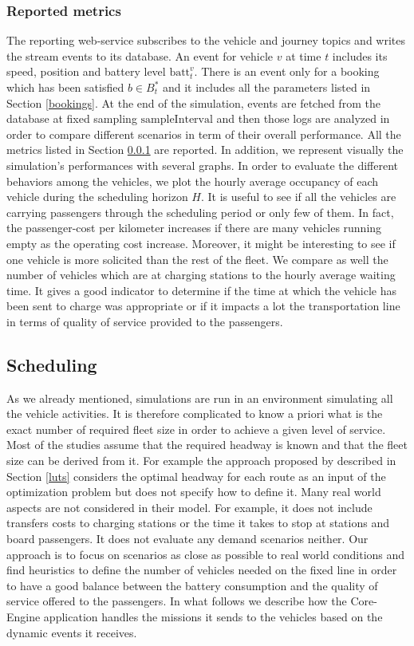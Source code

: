 \documentclass[12pt,a4paper]{article}
\begin{document}
\subsubsection{Reported metrics}\label{metrics}
The reporting web-service subscribes to the vehicle and journey topics and writes the stream events to its database. An event for vehicle $v$ at time $t$ includes its speed, position and battery level $\text{batt}_{t}^{v}$. There is an event only for a booking which has been satisfied $b \in B^{*}_{t}$ and it includes all the parameters listed in Section \ref{bookings}. At the end of the simulation, events are fetched from the database at fixed sampling $\text{sampleInterval}$ and then those logs are analyzed in order to compare different scenarios in term of their overall performance. All the metrics listed in Section \ref{metrics} are reported. In addition, we represent visually the simulation's performances with several graphs. In order to evaluate the different behaviors among the vehicles, we plot the hourly average occupancy of each vehicle during the scheduling horizon $H$. It is useful to see if all the vehicles are carrying passengers through the scheduling period or only few of them. In fact, the passenger-cost per kilometer increases if there are many vehicles running empty as the operating cost increase. Moreover, it might be interesting to see if one vehicle is more solicited than the rest of the fleet. We compare as well the number of vehicles which are at charging stations to the hourly average waiting time. It gives a good indicator to determine if the time at which the vehicle has been sent to charge was appropriate or if it impacts a lot the transportation line in terms of quality of service provided to the passengers.

\subsection{Scheduling}\label{scheduling}
As we already mentioned, simulations are run in an environment simulating all the vehicle activities. It is therefore complicated to know a priori what is the exact number of required fleet size in order to achieve a given level of service. Most of the studies assume that the required headway is known and that the fleet size can be derived from it. For example the approach proposed by \cite{luts} described in Section \ref{luts} considers the optimal headway for each route as an input of the optimization problem but does not specify how to define it. Many real world aspects are not considered in their model. For example, it does not include transfers costs to charging stations or the time it takes to stop at stations and board passengers. It does not evaluate any demand scenarios neither. Our approach is to focus on scenarios as close as possible to real world conditions and find heuristics to define the number of vehicles needed on the fixed line in order to have a good balance between the battery consumption and the quality of service offered to the passengers. In what follows we describe how the Core-Engine application handles the missions it sends to the vehicles based on the dynamic events it receives. 
\end{document}
